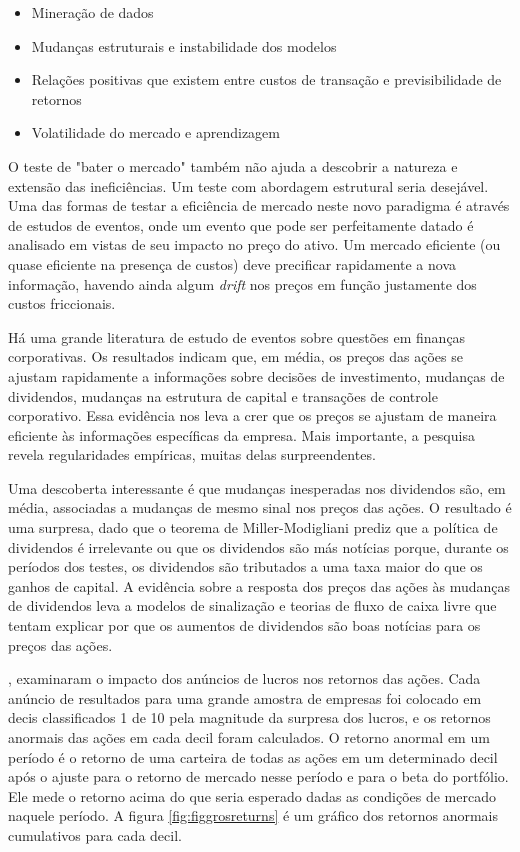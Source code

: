 \begin{itemize}
	\item Mineração de dados
	\item Mudanças estruturais e instabilidade dos modelos
	\item Relações positivas que existem entre custos de transação e previsibilidade de retornos
	\item Volatilidade do mercado e aprendizagem
\end{itemize}

O teste de "bater o mercado" também não ajuda a descobrir a natureza e extensão das ineficiências. Um teste com abordagem estrutural seria desejável. Uma das formas de testar a eficiência de mercado neste novo paradigma é através de estudos de eventos, onde um evento que pode ser perfeitamente datado é analisado em vistas de seu impacto no preço do ativo. Um mercado eficiente (ou quase eficiente na presença de custos) deve precificar rapidamente a nova informação, havendo ainda algum \emph{drift} nos preços em função justamente dos custos friccionais.

Há uma grande literatura de estudo de eventos sobre questões em finanças corporativas. Os resultados indicam que, em média, os preços das ações se ajustam rapidamente a informações sobre decisões de investimento, mudanças de dividendos, mudanças na estrutura de capital e transações de controle corporativo. Essa evidência nos leva a crer que os preços se ajustam de maneira eficiente às informações específicas da empresa. Mais importante, a pesquisa revela regularidades empíricas, muitas delas surpreendentes.

Uma descoberta interessante é que mudanças inesperadas nos dividendos são, em média, associadas a mudanças de mesmo sinal nos preços das ações. O resultado é uma surpresa, dado que o teorema de Miller-Modigliani prediz que a política de dividendos é irrelevante ou que os dividendos são más notícias porque, durante os períodos dos testes, os dividendos são tributados a uma taxa maior do que os ganhos de capital. A evidência sobre a resposta dos preços das ações às mudanças de dividendos leva a modelos de sinalização  e teorias de fluxo de caixa livre que tentam explicar por que os aumentos de dividendos são boas notícias para os preços das ações. 

, examinaram o impacto dos anúncios de lucros nos retornos das ações. Cada anúncio de resultados para uma grande amostra de empresas foi colocado em decis classificados 1 de 10 pela magnitude da surpresa dos lucros, e os retornos anormais das ações em cada decil foram calculados. O retorno anormal em um período é o retorno de uma carteira de todas as ações em um determinado decil após o ajuste para o retorno de mercado nesse período e para o beta do portfólio. Ele mede o retorno acima do que seria esperado dadas as condições de mercado naquele período. A figura \ref{fig:figgrosreturns} é um gráfico dos retornos anormais cumulativos para cada decil.

